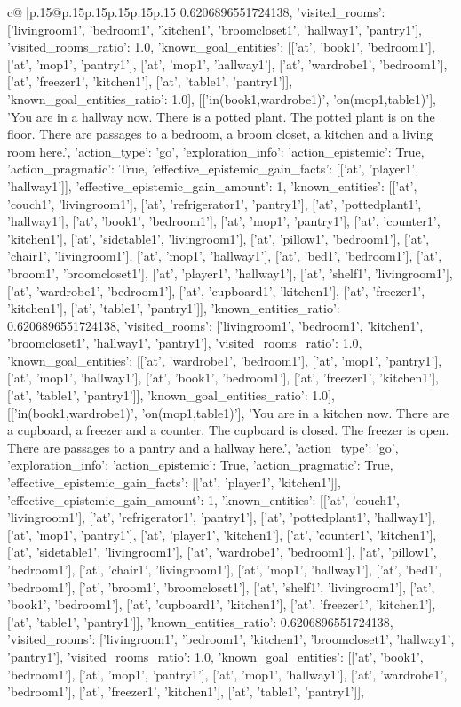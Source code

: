 \documentclass{article}
\begin{document}
{\begin{supertabular}{c@{$\;$}|p{.15\linewidth}@{}p{.15\linewidth}p{.15\linewidth}p{.15\linewidth}p{.15\linewidth}p{.15\linewidth}}
{{{0.6206896551724138, 'visited_rooms': ['livingroom1', 'bedroom1', 'kitchen1', 'broomcloset1', 'hallway1', 'pantry1'], 'visited_rooms_ratio': 1.0, 'known_goal_entities': [['at', 'book1', 'bedroom1'], ['at', 'mop1', 'pantry1'], ['at', 'mop1', 'hallway1'], ['at', 'wardrobe1', 'bedroom1'], ['at', 'freezer1', 'kitchen1'], ['at', 'table1', 'pantry1']], 'known_goal_entities_ratio': 1.0}}], [['in(book1,wardrobe1)', 'on(mop1,table1)'], 'You are in a hallway now. There is a potted plant. The potted plant is on the floor. There are passages to a bedroom, a broom closet, a kitchen and a living room here.', {'action_type': 'go', 'exploration_info': {'action_epistemic': True, 'action_pragmatic': True, 'effective_epistemic_gain_facts': [['at', 'player1', 'hallway1']], 'effective_epistemic_gain_amount': 1, 'known_entities': [['at', 'couch1', 'livingroom1'], ['at', 'refrigerator1', 'pantry1'], ['at', 'pottedplant1', 'hallway1'], ['at', 'book1', 'bedroom1'], ['at', 'mop1', 'pantry1'], ['at', 'counter1', 'kitchen1'], ['at', 'sidetable1', 'livingroom1'], ['at', 'pillow1', 'bedroom1'], ['at', 'chair1', 'livingroom1'], ['at', 'mop1', 'hallway1'], ['at', 'bed1', 'bedroom1'], ['at', 'broom1', 'broomcloset1'], ['at', 'player1', 'hallway1'], ['at', 'shelf1', 'livingroom1'], ['at', 'wardrobe1', 'bedroom1'], ['at', 'cupboard1', 'kitchen1'], ['at', 'freezer1', 'kitchen1'], ['at', 'table1', 'pantry1']], 'known_entities_ratio': 0.6206896551724138, 'visited_rooms': ['livingroom1', 'bedroom1', 'kitchen1', 'broomcloset1', 'hallway1', 'pantry1'], 'visited_rooms_ratio': 1.0, 'known_goal_entities': [['at', 'wardrobe1', 'bedroom1'], ['at', 'mop1', 'pantry1'], ['at', 'mop1', 'hallway1'], ['at', 'book1', 'bedroom1'], ['at', 'freezer1', 'kitchen1'], ['at', 'table1', 'pantry1']], 'known_goal_entities_ratio': 1.0}}], [['in(book1,wardrobe1)', 'on(mop1,table1)'], 'You are in a kitchen now. There are a cupboard, a freezer and a counter. The cupboard is closed. The freezer is open. There are passages to a pantry and a hallway here.', {'action_type': 'go', 'exploration_info': {'action_epistemic': True, 'action_pragmatic': True, 'effective_epistemic_gain_facts': [['at', 'player1', 'kitchen1']], 'effective_epistemic_gain_amount': 1, 'known_entities': [['at', 'couch1', 'livingroom1'], ['at', 'refrigerator1', 'pantry1'], ['at', 'pottedplant1', 'hallway1'], ['at', 'mop1', 'pantry1'], ['at', 'player1', 'kitchen1'], ['at', 'counter1', 'kitchen1'], ['at', 'sidetable1', 'livingroom1'], ['at', 'wardrobe1', 'bedroom1'], ['at', 'pillow1', 'bedroom1'], ['at', 'chair1', 'livingroom1'], ['at', 'mop1', 'hallway1'], ['at', 'bed1', 'bedroom1'], ['at', 'broom1', 'broomcloset1'], ['at', 'shelf1', 'livingroom1'], ['at', 'book1', 'bedroom1'], ['at', 'cupboard1', 'kitchen1'], ['at', 'freezer1', 'kitchen1'], ['at', 'table1', 'pantry1']], 'known_entities_ratio': 0.6206896551724138, 'visited_rooms': ['livingroom1', 'bedroom1', 'kitchen1', 'broomcloset1', 'hallway1', 'pantry1'], 'visited_rooms_ratio': 1.0, 'known_goal_entities': [['at', 'book1', 'bedroom1'], ['at', 'mop1', 'pantry1'], ['at', 'mop1', 'hallway1'], ['at', 'wardrobe1', 'bedroom1'], ['at', 'freezer1', 'kitchen1'], ['at', 'table1', 'pantry1']], }}}
\end{supertabular}}
\end{document}
